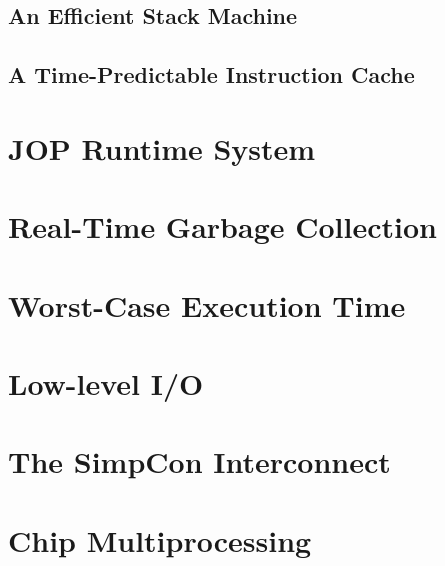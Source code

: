     

\clearpage
    \section{An Efficient Stack Machine}
    \label{sec:stack}
    

\clearpage
    
\clearpage
    

\clearpage
    \section{A Time-Predictable Instruction Cache}
    \label{sec:cache}
    

\chapter{JOP Runtime System}
\label{chap:runtime}

    
    
    
    
\clearpage
    
    

\chapter{Real-Time Garbage Collection}
\label{chap:rtgc}
    

\chapter{Worst-Case Execution Time}
\label{chap:wcet}
    

\chapter{Low-level I/O}
\label{chap:io}
    

\chapter{The SimpCon Interconnect}
\label{chap:simpcon}
\newcommand{\scgrsc}{.65}
\newcommand{\scgrp}{simpcon}



\chapter{Chip Multiprocessing}
\label{chap:cmp}



